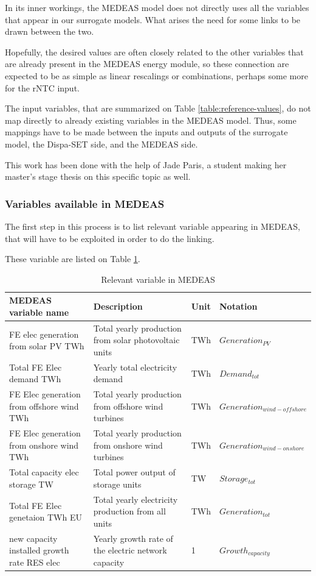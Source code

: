 In its inner workings, the MEDEAS model does not directly uses all the variables that appear in our surrogate models. What arises the need for some links to be drawn between the two.

Hopefully, the desired values are often closely related to the other variables that are already present in the MEDEAS energy module, so these connection are expected to be as simple as linear rescalings or combinations, perhaps some more for the rNTC input.

The input variables, that are summarized on Table \ref{table:reference-values}, do not map directly to already existing variables in the MEDEAS model. Thus, some mappings have to be made between the inputs and outputs of the surrogate model, the Dispa-SET side, and the MEDEAS side.

This work has been done with the help of Jade Paris, a student making her master's stage thesis on this specific topic as well.

\subsubsection{Variables available in MEDEAS}

The first step in this process is to list relevant variable appearing in MEDEAS, that will have to be exploited in order to do the linking.

These variable are listed on Table \ref{tab:medeas-vars}.

\begin{table}[h]
    \centering
    \begin{tabular}{|p{5cm}|p{5cm}|p{1cm}|p{4cm}|} \hline 
    MEDEAS variable name &  Description & Unit & Notation \\ \hline
     FE elec generation from solar PV TWh & Total yearly production from solar photovoltaic units & TWh & $Generation_{PV}$\\ \hline 
     Total FE Elec demand TWh & Yearly total electricity demand & TWh & $Demand_{tot}$ \\ \hline 
     FE Elec generation from offshore wind TWh & Total yearly production from offshore wind turbines & TWh & $Generation_{wind-offshore}$ \\ \hline 
     FE Elec generation from onshore wind TWh & Total yearly production from onshore wind turbines & TWh & $Generation_{wind-onshore}$ \\ \hline 
     Total capacity elec storage TW & Total power output of storage units & TW & $Storage_{tot}$ \\ \hline 
     Total FE Elec genetaion TWh EU & Total yearly electricity production from all units & TWh & $Generation_{tot}$ \\ \hline 
     new capacity installed growth rate RES elec & Yearly growth rate of the electric network capacity & 1 & $Growth_{capacity}$ \\ \hline
    \end{tabular}
    \caption{Relevant variable in MEDEAS}
    \label{tab:medeas-vars}
\end{table}

